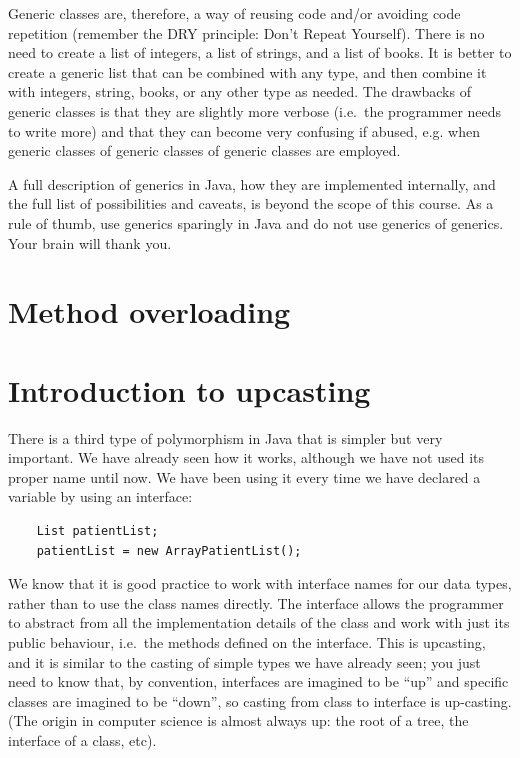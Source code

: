 Generic classes are, therefore, a way of reusing code and/or avoiding
code repetition (remember the DRY principle: Don't Repeat Yourself). 
There is no need to create a list of integers, a list of
strings, and a list of books. It is better to create a generic list
that can be combined with any type, and then combine it with integers,
string, books, or any other type as needed. The drawbacks of generic
classes is that they are slightly more verbose (i.e.~the programmer
needs to write more) and that they can become very confusing if
abused, e.g. when generic classes of generic classes of generic
classes are employed. 

A full description of generics in Java, how they are implemented
internally, and the full list of possibilities and caveats, is beyond
the scope of this course. As a rule of thumb, use generics sparingly in
Java and do not use generics of generics. Your brain will thank you. 


\section{Method overloading}
\label{sec:method-overloading}



\section{Introduction to upcasting}
\label{sec:upcasting}

There is a third type of
polymorphism in Java that is simpler but very important. We have
already seen how it works, although we have not used its proper name
until now.
We have been using it every time we have declared
a variable by using an interface: 

\begin{verbatim}
    List patientList;
    patientList = new ArrayPatientList();
\end{verbatim}

We know that it is good practice to work with interface names for our
data types, rather than to use the class names directly. The interface
allows the programmer to abstract from all the implementation details
of the class and work with just its public behaviour, i.e.~the methods
defined on the interface. This is upcasting, and it is similar to the
casting of simple types we have already seen; you just need to know
that, by convention, interfaces are imagined to be ``up'' and specific
classes are imagined to be ``down'', so casting from class to
interface is up-casting. (The origin in computer science is almost
always up: the root of a tree, the interface of a class, etc). 

